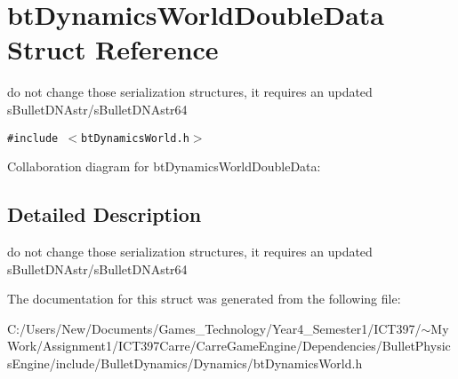 \hypertarget{structbt_dynamics_world_double_data}{
\section{btDynamicsWorldDoubleData Struct Reference}
\label{structbt_dynamics_world_double_data}
}
do not change those serialization structures, it requires an updated sBulletDNAstr/sBulletDNAstr64  


{\tt \#include $<$btDynamicsWorld.h$>$}

Collaboration diagram for btDynamicsWorldDoubleData:

\subsection{Detailed Description}
do not change those serialization structures, it requires an updated sBulletDNAstr/sBulletDNAstr64 

The documentation for this struct was generated from the following file:\begin{CompactItemize}
\item 
C:/Users/New/Documents/Games\_\-Technology/Year4\_\-Semester1/ICT397/$\sim$My Work/Assignment1/ICT397Carre/CarreGameEngine/Dependencies/BulletPhysicsEngine/include/BulletDynamics/Dynamics/btDynamicsWorld.h\end{CompactItemize}
